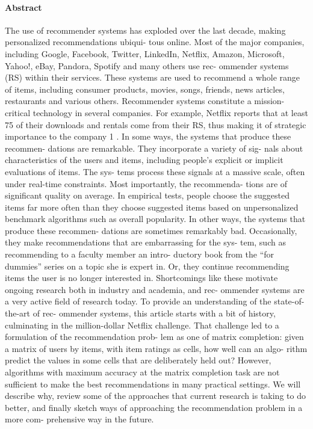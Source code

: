 \documentclass[oneside]{book}
\begin{document}
\paragraph{Abstract}
The use of recommender systems has exploded over the
last decade, making personalized recommendations ubiqui-
tous online. Most of the major companies, including Google,
Facebook,  Twitter,  LinkedIn,  Netflix,  Amazon,  Microsoft,
Yahoo!,  eBay,  Pandora,  Spotify  and  many  others  use  rec-
ommender systems (RS) within their services.
These systems are used to recommend a whole range of
items, including consumer products, movies, songs, friends,
news articles, restaurants and various others.  Recommender
systems  constitute  a  mission-critical  technology  in  several
companies.  For example, Netflix reports that at least 75%
of  their  downloads  and  rentals  come  from  their  RS,  thus
making it of strategic importance to the company
1
.
In some ways, the systems that produce these recommen-
dations are remarkable.  They incorporate a variety of sig-
nals about characteristics of the users and items, including
people’s explicit or implicit evaluations of items.  The sys-
tems  process  these  signals  at  a  massive  scale,  often  under
real-time constraints.  Most importantly, the recommenda-
tions are of significant quality on average.  In empirical tests,
people choose the suggested items far more often than they
choose suggested items based on unpersonalized benchmark
algorithms such as overall popularity.
In other ways, the systems that produce these recommen-
dations are sometimes remarkably bad.  Occasionally, they make  recommendations  that  are  embarrassing  for  the  sys-
tem, such as recommending to a faculty member an intro-
ductory book from the “for dummies” series on a topic she is
expert in.  Or, they continue recommending items the user
is no longer interested in.  Shortcomings like these motivate
ongoing  research  both  in  industry  and  academia,  and  rec-
ommender systems are a very active field of research today.
To provide an understanding of the state-of-the-art of rec-
ommender systems, this article starts with a bit of history,
culminating  in  the  million-dollar  Netflix  challenge.   That
challenge led to a formulation of the recommendation prob-
lem  as  one  of  matrix  completion:  given  a  matrix  of  users
by items, with item ratings as cells, how well can an algo-
rithm predict the values in some cells that are deliberately
held out?  However, algorithms with maximum accuracy at
the  matrix  completion  task  are  not  sufficient  to  make  the
best recommendations in many practical settings.  We will
describe  why,  review  some  of  the  approaches  that  current
research  is  taking  to  do  better,  and  finally  sketch  ways  of
approaching the recommendation problem in a more com-
prehensive way in the future.
\end{document}

